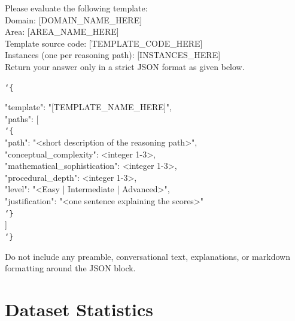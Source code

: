\begin{tcolorbox}[
    colback=gray!5,
    colframe=gray!40,
    boxrule=0.4pt,
    arc=2pt,
    left=6pt,
    right=6pt,
    top=6pt,
    bottom=6pt,
    breakable
]
Please evaluate the following template: \\
Domain: [DOMAIN\_NAME\_HERE] \\
Area: [AREA\_NAME\_HERE] \\
Template source code: [TEMPLATE\_CODE\_HERE] \\
Instances (one per reasoning path): [INSTANCES\_HERE] \\

Return your answer only in a strict JSON format as given below.

\vspace{8pt}
\noindent\bgroup\ttfamily
\texttt{\char`\{}

\vspace{4pt}
\hspace*{1em}"template": "[TEMPLATE\_NAME\_HERE]",\\
\hspace*{1em}"paths": [\\
\hspace*{2em}\texttt{\char`\{}\\
\hspace*{3em}"path": "<short description of the reasoning path>",\\
\hspace*{3em}"conceptual\_complexity": <integer 1-3>,\\
\hspace*{3em}"mathematical\_sophistication": <integer 1-3>,\\
\hspace*{3em}"procedural\_depth": <integer 1-3>,\\
\hspace*{3em}"level": "<Easy | Intermediate | Advanced>",\\
\hspace*{3em}"justification": "<one sentence explaining the scores>"\\
\hspace*{2em}\texttt{\char`\}}\\
\hspace*{1em}]\\
\texttt{\char`\}}
\egroup
\vspace{8pt}

Do not include any preamble, conversational text, explanations, or markdown formatting around the JSON block.
\end{tcolorbox}

\section{Dataset Statistics}
\label{appendix:statistics}


